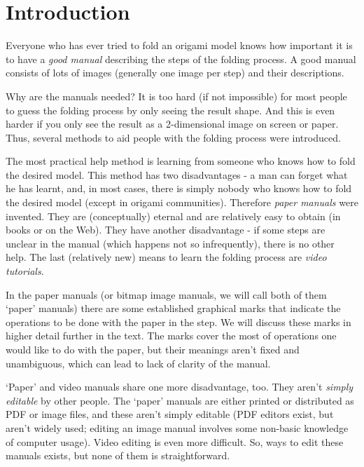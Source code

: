 
\chapter*{Introduction}

Everyone who has ever tried to fold an origami model knows how important it is to have a \emph{good manual} describing the steps of the folding process. A good manual consists of lots of images (generally one image per step) and their descriptions. 

Why are the manuals needed? It is too hard (if not impossible) for most people to guess the folding process by only seeing the result shape. And this is even harder if you only see the result as a 2-dimensional image on screen or paper. Thus, several methods to aid people with the folding process were introduced.

The most practical help method is learning from someone who knows how to fold the desired model. This method has two disadvantages - a man can forget what he has learnt, and, in most cases, there is simply nobody who knows how to fold the desired model (except in origami communities). Therefore \emph{paper manuals} were invented. They are (conceptually) eternal and are relatively easy to obtain (in books or on the Web). They have another disadvantage - if some steps are unclear in the manual (which happens not so infrequently), there is no other help. The last (relatively new) means to learn the folding process are \emph{video tutorials}.

In the paper manuals (or bitmap image manuals, we will call both of them `paper' manuals) there are some established graphical marks that indicate the operations to be done with the paper in the step. We will discuss these marks in higher detail further in the text. The marks cover the most of operations one would like to do with the paper, but their meanings aren't fixed and unambiguous, which can lead to lack of clarity of the manual.

`Paper' and video manuals share one more disadvantage, too. They aren't \emph{simply editable} by other people. The `paper' manuals are either printed or distributed as PDF or image files, and these aren't simply editable (PDF editors exist, but aren't widely used; editing an image manual involves some non-basic knowledge of computer usage). Video editing is even more difficult. So, ways to edit these manuals exists, but none of them is straightforward.

